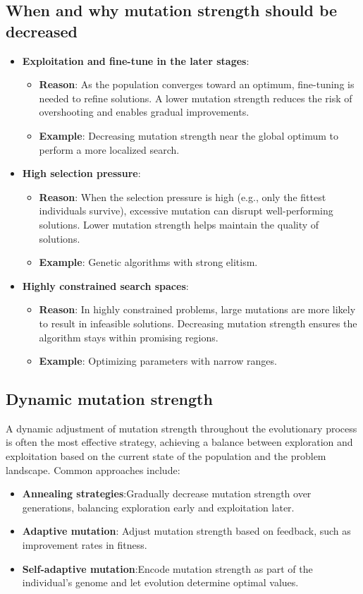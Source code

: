 \documentclass[12pt,letterpaper]{article}
\begin{document}
\subsection*{When and why mutation strength should be decreased}
\begin{itemize}
    \item \textbf{Exploitation and fine-tune in the later stages}:
    \begin{itemize}
        \item \textbf{Reason}: As the population converges toward an optimum, fine-tuning is needed to refine solutions. A lower mutation strength reduces the risk of overshooting and enables gradual improvements.
        \item \textbf{Example}: Decreasing mutation strength near the global optimum to perform a more localized search.
    \end{itemize}
    \item \textbf{High selection pressure}:
    \begin{itemize}
        \item \textbf{Reason}: When the selection pressure is high (e.g., only the fittest individuals survive), excessive mutation can disrupt well-performing solutions. Lower mutation strength helps maintain the quality of solutions.
        \item \textbf{Example}: Genetic algorithms with strong elitism.
    \end{itemize}
    \item \textbf{Highly constrained search spaces}:
    \begin{itemize}
        \item \textbf{Reason}: In highly constrained problems, large mutations are more likely to result in infeasible solutions.
        Decreasing mutation strength ensures the algorithm stays within promising regions.
        \item \textbf{Example}: Optimizing parameters with narrow ranges.
    \end{itemize}
\end{itemize}

\subsection*{Dynamic mutation strength}
A dynamic adjustment of mutation strength throughout the evolutionary process is often the most effective strategy, achieving a balance between exploration and exploitation based on the current state of the population and the problem landscape. Common approaches include:
\begin{itemize}
    \item \textbf{Annealing strategies}:Gradually decrease mutation strength over generations, balancing exploration early and exploitation later.
    \item \textbf{Adaptive mutation}: Adjust mutation strength based on feedback, such as improvement rates in fitness.
    \item \textbf{Self-adaptive mutation}:Encode mutation strength as part of the individual's genome and let evolution determine optimal values.
\end{itemize}
\end{document}
